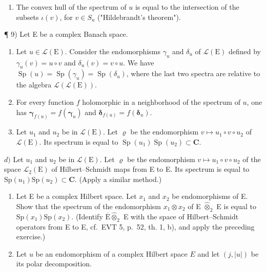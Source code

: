 \begin{enumerate}
\def\labelenumi{\alph{enumi})}
\setcounter{enumi}{1}
\tightlist
\item
  The convex hull of the spectrum of \(u\) is equal to the intersection of the subsets \(\iota(v)\), for \(v \in S_u\) ("Hildebrandt's theorem").
\end{enumerate}

¶ 9) Let E be a complex Banach space.

\begin{enumerate}
\def\labelenumi{\alph{enumi})}
\item
  Let \(u \in \mathcal{L}(\mathrm{E})\). Consider the endomorphisms \(\gamma_{u}\) and \(\delta_{u}\) of \(\mathcal{L}(\mathrm{E})\) defined by \(\gamma_{u}(v) = u \circ v\) and \(\delta_{u}(v) = v \circ u\). We have \(\operatorname{Sp}(u) = \operatorname{Sp}(\gamma_{u}) = \operatorname{Sp}(\delta_{u})\), where the last two spectra are relative to the algebra \(\mathcal{L}(\mathcal{L}(\mathrm{E}))\).
\item
  For every function \(f\) holomorphic in a neighborhood of the spectrum of \(u\), one has \(\boldsymbol{\gamma}_{f(u)} = f(\boldsymbol{\gamma}_{u})\) and \(\boldsymbol{\delta}_{f(u)} = f(\boldsymbol{\delta}_{u})\).
\item
  Let \(u_{1}\) and \(u_{2}\) be in \(\mathcal{L}(\mathrm{E})\). Let \(\varrho\) be the endomorphism \(v \mapsto u_{1} \circ v \circ u_{2}\) of \(\mathcal{L}(\mathrm{E})\). Its spectrum is equal to \(\operatorname{Sp}(u_{1})\operatorname{Sp}(u_{2}) \subset \mathbf{C}\).
\end{enumerate}

\(d)\) Let \(u_{1}\) and \(u_{2}\) be in \(\mathcal{L}(\mathrm{E})\). Let \(\varrho\) be the endomorphism \(v \mapsto u_{1} \circ v \circ u_{2}\) of the space \(\mathcal{L}_{2}(\mathrm{E})\) of Hilbert--Schmidt maps from E to E. Its spectrum is equal to \(\mathrm{Sp}(u_{1})\mathrm{Sp}(u_{2}) \subset \mathbf{C}\). (Apply a similar method.)

\begin{enumerate}
\def\labelenumi{\arabic{enumi})}
\setcounter{enumi}{9}
\item
  Let E be a complex Hilbert space. Let \(x_1\) and \(x_2\) be endomorphisms of E. Show that the spectrum of the endomorphism \(x_1 \otimes x_2\) of E \(\widehat{\otimes}_2\) E is equal to \(\mathrm{Sp}(x_1) \mathrm{Sp}(x_2)\). (Identify \(\overline{\mathrm{E}} \widehat{\otimes}_2\) E with the space of Hilbert--Schmidt operators from E to E, cf.~EVT 5, p.~52, th. 1, b), and apply the preceding exercise.)
\item
  Let \(u\) be an endomorphism of a complex Hilbert space \(E\) and let \((j, |u|)\) be its polar decomposition.
\end{enumerate}

